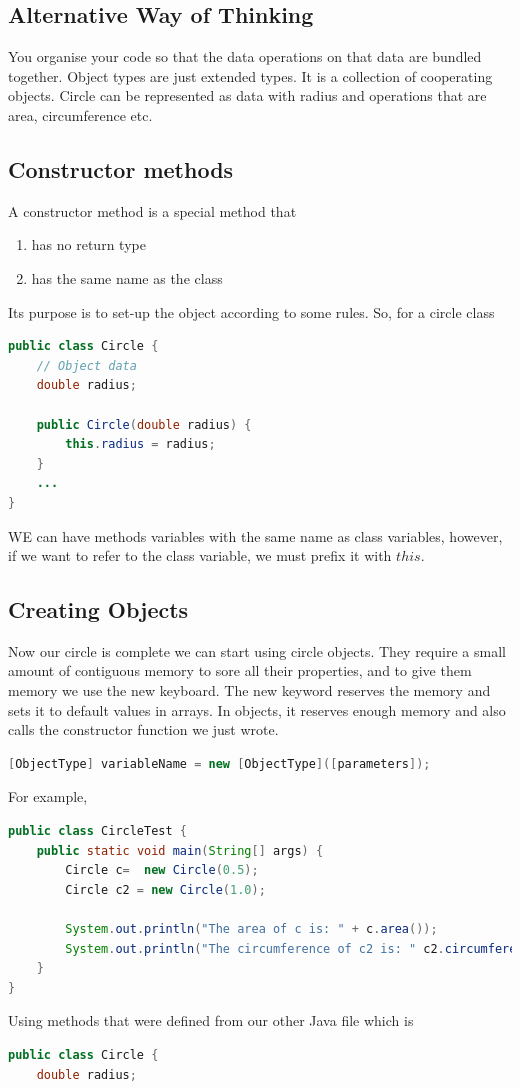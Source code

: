 \documentclass[11pt,a4 paper]{book}
\theoremstyle{plain}
\theoremstyle{definition}
\theoremstyle{remark}
\begin{document}
\begin{flushleft}
\subsection{Alternative Way of Thinking}
You organise your code so that the data operations on that data are bundled together. Object types are just extended types. It is a collection of cooperating objects. Circle can be represented as data with radius and operations that are area, circumference etc. 
\subsection{Constructor methods}
A constructor method is a special method that 
\begin{enumerate}
	\item has no return type
	\item has the same name as the class
\end{enumerate}
Its purpose is to set-up the object according to some rules.
So, for a circle class
\begin{lstlisting}[language = Java]
public class Circle {
	// Object data
	double radius;

	public Circle(double radius) {
		this.radius = radius;
	}
	...
}
\end{lstlisting}
WE can have methods variables with the same name as class variables, however, if we want to refer to the class variable, we must prefix it with $this$.

\subsection{Creating Objects}
Now our circle is complete we can start using circle objects. They require a small amount of contiguous memory to sore all their properties, and to give them memory we use the new keyboard. The new keyword reserves the memory and sets it to default values in arrays. In objects, it reserves enough memory and also calls the constructor function we just wrote.
\begin{lstlisting}[language = Java]
[ObjectType] variableName = new [ObjectType]([parameters]);
\end{lstlisting}
For example,
\begin{lstlisting}[language = Java]
public class CircleTest {
	public static void main(String[] args) { 
		Circle c=  new Circle(0.5);
		Circle c2 = new Circle(1.0);

		System.out.println("The area of c is: " + c.area());
		System.out.println("The circumference of c2 is: " c2.circumference());
	}
}
\end{lstlisting}
Using methods that were defined from our other Java file which is
\begin{lstlisting}[language = Java]
public class Circle {
	double radius;


\end{lstlisting}
\end{flushleft}
\end{document}
